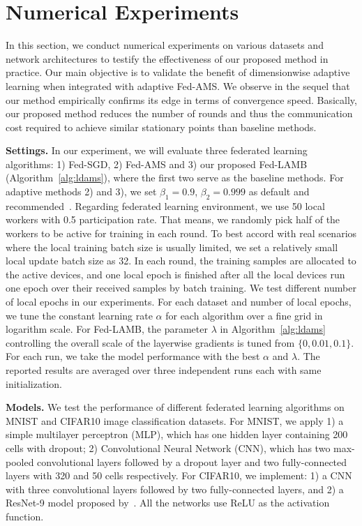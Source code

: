 \documentclass{article}
\begin{document}
\section{Numerical Experiments}\label{sec:numerical}

In this section, we conduct numerical experiments on various datasets and network architectures to testify the effectiveness of our proposed method in practice. Our main objective is to validate the benefit of dimensionwise adaptive learning when integrated with adaptive Fed-AMS.
We observe in the sequel that our method empirically confirms its edge in terms of convergence speed.
Basically, our proposed method reduces the number of rounds and thus the communication cost required to achieve similar stationary points than baseline methods. 

\noindent\textbf{Settings.} In our experiment, we will evaluate three federated learning algorithms: 1) Fed-SGD, 2) Fed-AMS and 3) our proposed Fed-LAMB (Algorithm~\ref{alg:ldams}), where the first two serve as the baseline methods. For adaptive methods 2) and 3), we set $\beta_1=0.9$, $\beta_2=0.999$ as default and recommended~\citep{RKK18}. Regarding federated learning environment, we use 50 local workers with 0.5 participation rate. That means, we randomly pick half of the workers to be active for training in each round. To best accord with real scenarios where the local training batch size is usually limited, we set a relatively small local update batch size as 32. In each round, the training samples are allocated to the active devices, and one local epoch is finished after all the local devices run one epoch over their received samples by batch training. We test different number of local epochs in our experiments. For each dataset and number of local epochs, we tune the constant learning rate $\alpha$ for each algorithm over a fine grid in logarithm scale. For Fed-LAMB, the parameter $\lambda$ in Algorithm~\ref{alg:ldams} controlling the overall scale of the layerwise gradients is tuned from $\{0,0.01,0.1\}$. For each run, we take the model performance with the best $\alpha$ and $\lambda$. The reported results are averaged over three independent runs each with same initialization.

\noindent\textbf{Models.} We test the performance of different federated learning algorithms on MNIST and CIFAR10 image classification datasets. For MNIST, we apply 1) a simple multilayer perceptron (MLP), which has one hidden layer containing 200 cells with dropout; 2) Convolutional Neural Network (CNN), which has two max-pooled convolutional layers followed by a dropout layer and two fully-connected layers with 320 and 50 cells respectively. For CIFAR10, we implement: 1) a CNN with three convolutional layers followed by two fully-connected layers, and 2) a ResNet-9 model proposed by~\cite{Proc:He-resnet16}. All the networks use ReLU as the activation function.
\end{document}
